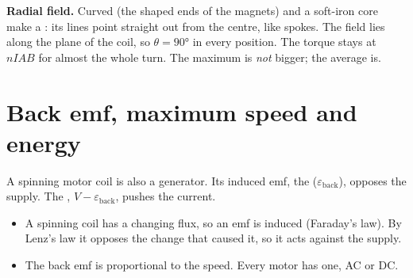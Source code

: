 \textbf{Radial field.} Curved  (the shaped ends of the magnets) and a
soft-iron core make a
: its lines point straight out from the centre, like spokes.
The field lies along the plane of the coil, so $\theta = \ang{90}$ in every position. The
torque stays at $nIAB$ for almost the whole turn. The maximum is \emph{not} bigger; the
average is.

\section{Back emf, maximum speed and energy}\label{ch5:sec:backemf}

\begin{bigidea}
A spinning motor coil is also a generator. Its induced emf, the 
($\varepsilon_\mathrm{back}$), opposes the supply. The ,
$V - \varepsilon_\mathrm{back}$, pushes the current.
\end{bigidea}

\begin{itemize}
  \item A spinning coil has a changing flux, so an emf is induced (Faraday's law). By
        Lenz's law it opposes the change that caused it, so it acts against the supply.
  \item The back emf is proportional to the speed. Every motor has one, AC or DC.
\end{itemize}

